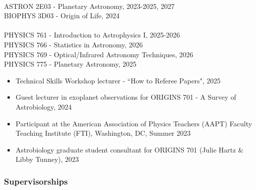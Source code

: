 \documentclass[12pt]{article}
\begin{document}
\\
ASTRON 2E03 - Planetary Astronomy, 2023-2025, 2027\\
BIOPHYS 3D03 - Origin of Life, 2024\\

\\
PHYSICS 761 - Introduction to Astrophysics I, 2025-2026\\
PHYSICS 766 - Statistics in Astronomy, 2026\\
PHYSICS 769 - Optical/Infrared Astronomy Techniques, 2026\\
PHYSICS 775 - Planetary Astronomy, 2025\\

\begin{itemize}[noitemsep]
\item Technical Skills Workshop lecturer - ``How to Referee Papers", 2025 
\item Guest lecturer in exoplanet observations for ORIGINS 701 - A Survey of Astrobiology, 2024
\item Participant at the American Association of Physics Teachers (AAPT) Faculty Teaching Institute (FTI), Washington, DC, Summer 2023
\item Astrobiology graduate student consultant for ORIGINS 701 (Julie Hartz \& Libby Tunney), 2023
\end{itemize}

\subsubsection*{Supervisorships} 
\end{document}
